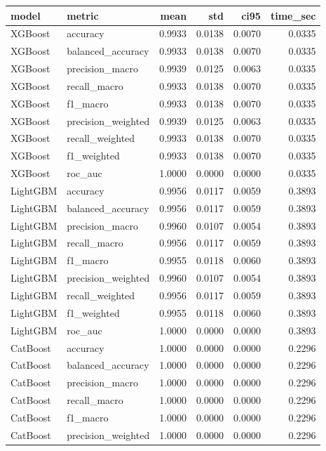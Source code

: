 \begin{tabular}{llrrrr}
\toprule
model & metric & mean & std & ci95 & time_sec \\
\midrule
XGBoost & accuracy & 0.9933 & 0.0138 & 0.0070 & 0.0335 \\
XGBoost & balanced_accuracy & 0.9933 & 0.0138 & 0.0070 & 0.0335 \\
XGBoost & precision_macro & 0.9939 & 0.0125 & 0.0063 & 0.0335 \\
XGBoost & recall_macro & 0.9933 & 0.0138 & 0.0070 & 0.0335 \\
XGBoost & f1_macro & 0.9933 & 0.0138 & 0.0070 & 0.0335 \\
XGBoost & precision_weighted & 0.9939 & 0.0125 & 0.0063 & 0.0335 \\
XGBoost & recall_weighted & 0.9933 & 0.0138 & 0.0070 & 0.0335 \\
XGBoost & f1_weighted & 0.9933 & 0.0138 & 0.0070 & 0.0335 \\
XGBoost & roc_auc & 1.0000 & 0.0000 & 0.0000 & 0.0335 \\
LightGBM & accuracy & 0.9956 & 0.0117 & 0.0059 & 0.3893 \\
LightGBM & balanced_accuracy & 0.9956 & 0.0117 & 0.0059 & 0.3893 \\
LightGBM & precision_macro & 0.9960 & 0.0107 & 0.0054 & 0.3893 \\
LightGBM & recall_macro & 0.9956 & 0.0117 & 0.0059 & 0.3893 \\
LightGBM & f1_macro & 0.9955 & 0.0118 & 0.0060 & 0.3893 \\
LightGBM & precision_weighted & 0.9960 & 0.0107 & 0.0054 & 0.3893 \\
LightGBM & recall_weighted & 0.9956 & 0.0117 & 0.0059 & 0.3893 \\
LightGBM & f1_weighted & 0.9955 & 0.0118 & 0.0060 & 0.3893 \\
LightGBM & roc_auc & 1.0000 & 0.0000 & 0.0000 & 0.3893 \\
CatBoost & accuracy & 1.0000 & 0.0000 & 0.0000 & 0.2296 \\
CatBoost & balanced_accuracy & 1.0000 & 0.0000 & 0.0000 & 0.2296 \\
CatBoost & precision_macro & 1.0000 & 0.0000 & 0.0000 & 0.2296 \\
CatBoost & recall_macro & 1.0000 & 0.0000 & 0.0000 & 0.2296 \\
CatBoost & f1_macro & 1.0000 & 0.0000 & 0.0000 & 0.2296 \\
CatBoost & precision_weighted & 1.0000 & 0.0000 & 0.0000 & 0.2296 \\

\end{tabular}
